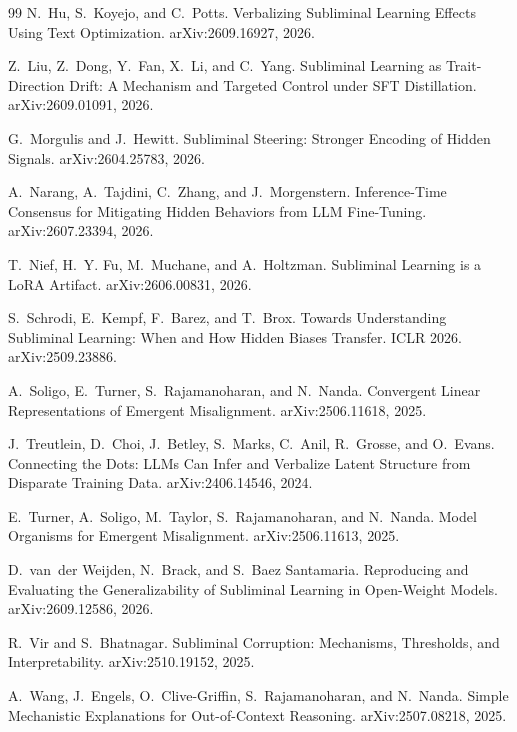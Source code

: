 \documentclass[11pt,a4paper]{article}
\begin{document}
\begin{thebibliography}{99}
N.~Hu, S.~Koyejo, and C.~Potts.
\newblock Verbalizing Subliminal Learning Effects Using Text Optimization.
\newblock arXiv:2609.16927, 2026.

Z.~Liu, Z.~Dong, Y.~Fan, X.~Li, and C.~Yang.
\newblock Subliminal Learning as Trait-Direction Drift: A Mechanism and Targeted Control under SFT Distillation.
\newblock arXiv:2609.01091, 2026.

G.~Morgulis and J.~Hewitt.
\newblock Subliminal Steering: Stronger Encoding of Hidden Signals.
\newblock arXiv:2604.25783, 2026.

A.~Narang, A.~Tajdini, C.~Zhang, and J.~Morgenstern.
\newblock Inference-Time Consensus for Mitigating Hidden Behaviors from LLM Fine-Tuning.
\newblock arXiv:2607.23394, 2026.

T.~Nief, H.~Y. Fu, M.~Muchane, and A.~Holtzman.
\newblock Subliminal Learning is a LoRA Artifact.
\newblock arXiv:2606.00831, 2026.

S.~Schrodi, E.~Kempf, F.~Barez, and T.~Brox.
\newblock Towards Understanding Subliminal Learning: When and How Hidden Biases Transfer.
\newblock ICLR 2026. arXiv:2509.23886.

A.~Soligo, E.~Turner, S.~Rajamanoharan, and N.~Nanda.
\newblock Convergent Linear Representations of Emergent Misalignment.
\newblock arXiv:2506.11618, 2025.

J.~Treutlein, D.~Choi, J.~Betley, S.~Marks, C.~Anil, R.~Grosse, and O.~Evans.
\newblock Connecting the Dots: LLMs Can Infer and Verbalize Latent Structure from Disparate Training Data.
\newblock arXiv:2406.14546, 2024.

E.~Turner, A.~Soligo, M.~Taylor, S.~Rajamanoharan, and N.~Nanda.
\newblock Model Organisms for Emergent Misalignment.
\newblock arXiv:2506.11613, 2025.

D.~van~der Weijden, N.~Brack, and S.~Baez Santamaria.
\newblock Reproducing and Evaluating the Generalizability of Subliminal Learning in Open-Weight Models.
\newblock arXiv:2609.12586, 2026.

R.~Vir and S.~Bhatnagar.
\newblock Subliminal Corruption: Mechanisms, Thresholds, and Interpretability.
\newblock arXiv:2510.19152, 2025.

A.~Wang, J.~Engels, O.~Clive-Griffin, S.~Rajamanoharan, and N.~Nanda.
\newblock Simple Mechanistic Explanations for Out-of-Context Reasoning.
\newblock arXiv:2507.08218, 2025.


\end{thebibliography}
\end{document}
